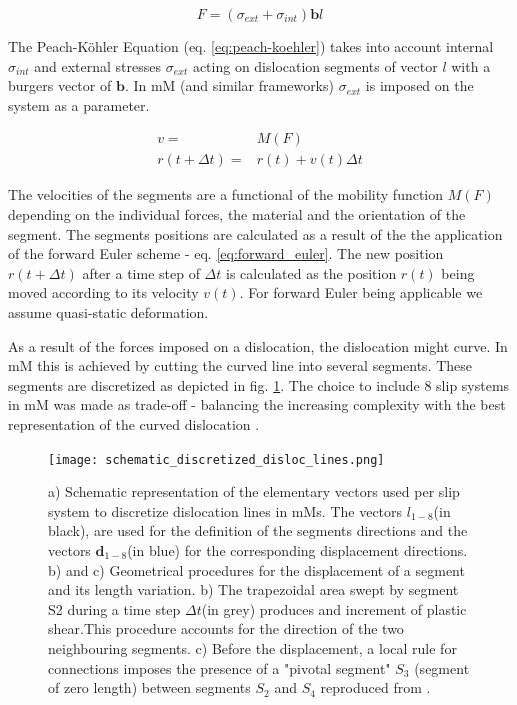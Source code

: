 \begin{equation}
	F = (\sigma_{ext}+\sigma_{int}) \mathbf{b}l  \label{eq:peach-koehler}
\end{equation}

The Peach-Köhler Equation (eq. \ref{eq:peach-koehler}) takes into account internal \( \sigma_{int} \) and external stresses  \( \sigma_{ext} \) acting on dislocation segments of vector \(l\) with a burgers vector of \( \mathbf{b}\). In mM (and similar frameworks) \( \sigma_{ext}\) is imposed on the system as a parameter. 

\begin{subequations}
	\begin{align}
		v =& M(F) \label{eq:vleocities_mobility_func} \\
		r(t+\Delta t) =& r(t) + v(t)\Delta t \label{eq:forward_euler}
	\end{align}
\end{subequations}

The velocities of the segments are a functional of the mobility function \(M(F)\) depending on the individual forces, the material and the orientation of the segment. The segments positions are calculated as a result of the the application of the forward Euler scheme - eq. \ref{eq:forward_euler}. The new position \( r(t+ \Delta t)\) after a time step of \(\Delta t\) is calculated as the position \(r(t)\) being moved according to its velocity \(v(t)\). For forward Euler being applicable we assume quasi-static deformation. 

As a result of the forces imposed on a dislocation, the dislocation might curve. In mM this is achieved by cutting the curved line into several segments. These segments are discretized as depicted in fig. \ref{fig:schematic_segments_dislocs}. The choice to include 8 slip systems in mM was made as trade-off - balancing the increasing complexity with the best representation of the curved dislocation \cite{devincre2011}.

\begin{figure}[htb]
	\centering
	\texttt{[image: schematic\_discretized\_disloc\_lines.png]}
	\label{fig:schematic_segments_dislocs}
	\caption{a) Schematic representation of the elementary vectors used per slip system to discretize dislocation lines in mMs. The vectors \(l_{1-8}\)(in black), are used for the deﬁnition of the segments directions and the vectors \(\mathbf{d}_{1-8}\)(in blue) for the corresponding displacement directions. b) and c) Geometrical procedures for the displacement of a segment and its length variation. b) The trapezoidal area swept by segment S2 during a time step \(\Delta t\)(in grey) produces and increment of plastic shear.This procedure accounts for the direction of the two neighbouring segments. c) Before the displacement, a local rule for connections imposes the presence of a "pivotal segment" \(S_{3}\) (segment of zero length) between segments \(S_{2}\) and \(S_{4}\) reproduced from \cite{devincre2011}.}
\end{figure}

